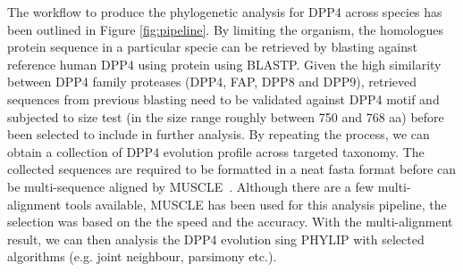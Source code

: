 The workflow to produce the phylogenetic analysis for DPP4 across species has been outlined in Figure \ref{fig:pipeline}. By limiting the organism, the homologues protein sequence in a particular specie can be retrieved by blasting against reference human DPP4 using protein using BLASTP. Given the high similarity between DPP4 family proteases (DPP4, FAP, DPP8 and DPP9), retrieved sequences from previous blasting need to be validated against DPP4 motif and subjected to size test (in the size range roughly between 750 and 768 aa) before been selected to include in further analysis. By repeating the process, we can obtain a collection of DPP4 evolution profile across targeted taxonomy. The collected sequences are required to be formatted in a neat fasta format before can be multi-sequence aligned by MUSCLE~\cite{15318951}. Although there are a few multi-alignment tools available, MUSCLE has been used for this analysis pipeline, the selection was based on the the speed and the accuracy. With the multi-alignment result, we can then analysis the DPP4 evolution sing PHYLIP with selected algorithms (e.g. joint neighbour, parsimony etc.). \\


